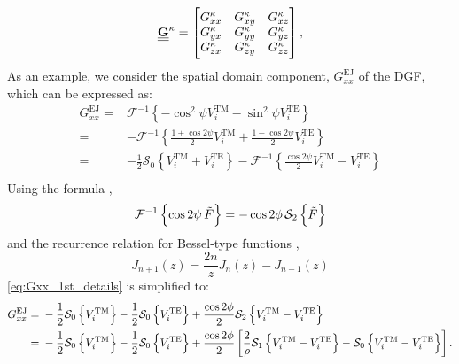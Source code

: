 \documentclass[12pt]{article}
\begin{document}
%
\begin{equation}
  \underline{\underline{\mathbf{G}}}^\mathrm{\kappa} =
  \begin{bmatrix}
    G_{xx}^\mathrm{\kappa} & G_{xy}^\mathrm{\kappa} & G_{xz}^\mathrm{\kappa} \\
    G_{yx}^\mathrm{\kappa} & G_{yy}^\mathrm{\kappa} & G_{yz}^\mathrm{\kappa} \\
    G_{zx}^\mathrm{\kappa} & G_{zy}^\mathrm{\kappa} & G_{zz}^\mathrm{\kappa} \\
  \end{bmatrix}
  \label{eq:matrix_dyadicG},
\end{equation}
%
As an example, we consider the spatial domain component, $G_{xx}^\mathrm{EJ}$ of the DGF, which can be expressed as:
%
\begin{equation}
  \begin{split}
    G_{xx}^\mathrm{EJ} ={}& \mathcal{F}^{-1} \left \{ - \cos^2 \psi V_i^\mathrm{TM} - \sin^2 \psi V_i^\mathrm{TE} \right \} \\
    ={}& - \mathcal{F}^{-1} \left \{\frac{1 + \cos 2\psi}{2} V_i^\mathrm{TM} + \frac{1 - \cos 2\psi}{2} V_i^\mathrm{TE} \right \} \\
    ={}& - \frac{1}{2} \mathcal{S}_0 \left \{ V_i^\mathrm{TM} + V_i^\mathrm{TE} \right \} - \mathcal{F}^{-1} \left \{ \frac{\cos 2\psi}{2} V_i^\mathrm{TM} -  V_i^\mathrm{TE} \right \} \\
  \end{split}
  \label{eq:Gxx_1st_details}%
\end{equation}
%
Using the formula \cite{Michalski2005},
%
\begin{equation}
  \mathcal{F}^{-1} \left \{ \cos 2 \psi \, \tilde{F} \right \} = - \cos 2 \phi \, \mathcal{S}_2 \left \{\tilde{F} \right \}
  \label{eq:trig_property}
\end{equation}
%
and the recurrence relation for Bessel-type functions \cite{abramowitz+stegun},
%
\begin{equation}
  J_{n+1}(z) = \frac{2n}{z} J_{n}(z) - J_{n-1}(z)
  \label{eq:recurrence}
\end{equation}
%
\eqref{eq:Gxx_1st_details} is simplified to:
%
\begin{equation}
  \begin{split}
    G_{xx}^\mathrm{EJ} ={}& - \frac{1}{2} \mathcal{S}_0 \left \{ V_i^\mathrm{TM} \right \} - \frac{1}{2} \mathcal{S}_0 \left \{ V_i^\mathrm{TE} \right \} + \frac{\cos 2 \phi}{2} \mathcal{S}_2 \left \{  V_i^\mathrm{TM} -  V_i^\mathrm{TE} \right \} \\
    ={}& - \frac{1}{2} \mathcal{S}_0 \left \{ V_i^\mathrm{TM} \right \} - \frac{1}{2} \mathcal{S}_0 \left \{ V_i^\mathrm{TE} \right \} + \frac{\cos 2 \phi}{2} \left[\frac{2}{\rho} \mathcal{S}_1 \left \{  V_i^\mathrm{TM} -  V_i^\mathrm{TE}  \right \} - \mathcal{S}_0 \left \{  V_i^\mathrm{TM} -  V_i^\mathrm{TE}  \right \} \right]. \\
  \end{split}
  \label{eq:Gxx_2nd_equation}
\end{equation}
\end{document}
